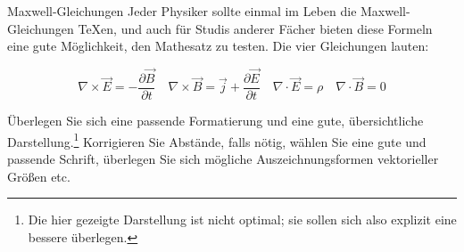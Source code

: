\documentclass[
	vorläufig=true, 
	blattnr=2,
	ausgabe=2016-11-04,
	abgabe=2016-11-11,
	shortverb,
]{../tex/latexkurs-exercise}
\begin{document}
\begin{aufgabe}[6]{Maxwell-Gleichungen}
	Jeder Physiker sollte einmal im Leben die Maxwell-Gleichungen \TeX{}en, und auch für Studis anderer Fächer bieten diese Formeln eine gute Möglichkeit, den Mathesatz zu testen. Die vier Gleichungen lauten:                                                                                                           
                                                                                                                                                                                                                                                                                                                               
        \[\textstyle \nabla \times \vec E = -\frac{\partial \vec B}{\partial t}\quad \nabla \times \vec B = \vec j + \frac{\partial \vec E}{\partial t}\quad \nabla \cdot \vec E = \rho\quad                                                                                                                                   
        \nabla \cdot \vec B = 0\]                                                                                                                                                                                                                                                                                              
                                                                                                                                                                                                                                                                                                                               
   \noindent Überlegen Sie sich eine passende Formatierung und eine gute, übersichtliche Darstellung.\footnote{Die hier gezeigte Darstellung ist nicht optimal; sie sollen sich also explizit eine bessere überlegen.} Korrigieren Sie Abstände, falls nötig, wählen Sie eine gute und passende Schrift, überlegen Sie sich mögliche Auszeichnungsformen vektorieller Größen etc.                                                                                                                                                                                                                                                                       
                                                                                                                                                                                                                                                                                                                               

\end{aufgabe}
\end{document}
